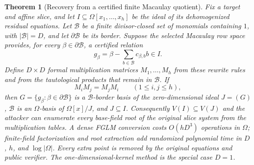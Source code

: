 \documentclass[11pt]{article}
\newtheorem{theorem}{Theorem}
\begin{document}
\begin{theorem}[Recovery from a certified finite Macaulay quotient]
\label{thm:finite-quotient-recovery}
Fix a target and affine slice, and let
$I\subseteq\Omega[x_1,\ldots,x_h]$ be the ideal of its dehomogenized
residual equations.  Let $\mathcal B$ be a finite divisor-closed set of
monomials containing $1$, with $|\mathcal B|=D$, and let
$\partial\mathcal B$ be its border.  Suppose the selected Macaulay row space
provides, for every $\beta\in\partial\mathcal B$, a certified relation
\begin{equation}\label{eq:border-relation}
 g_\beta=\beta-\sum_{b\in\mathcal B}c_{\beta,b}b\in I.
\end{equation}
Define $D\times D$ formal multiplication matrices
$M_1,\ldots,M_h$ from these rewrite rules and from the tautological products
that remain in $\mathcal B$.  If
\begin{equation}\label{eq:border-commute}
 M_iM_j=M_jM_i\qquad(1\le i,j\le h),
\end{equation}
then $G=\{g_\beta:\beta\in\partial\mathcal B\}$ is a
$\mathcal B$-border basis of the zero-dimensional ideal $J=(G)$,
$\mathcal B$ is an $\Omega$-basis of $\Omega[x]/J$, and $J\subseteq I$.
Consequently $V(I)\subseteq V(J)$ and the attacker can enumerate every
base-field root of the original slice system from the multiplication tables.
A dense FGLM conversion costs $O(hD^3)$ operations in $\Omega$; finite-field
factorization and root extraction add randomized polynomial time in
$D$, $h$, and $\log|\Omega|$.  Every extra point is removed by the original
equations and public verifier.  The one-dimensional-kernel method is the
special case $D=1$.
\end{theorem}
\end{document}
